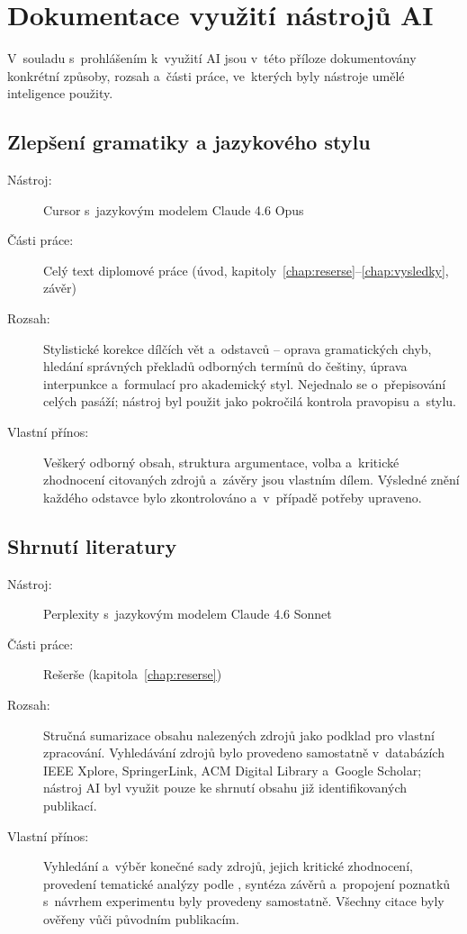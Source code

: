 \chapter{Dokumentace využití nástrojů AI}
\label{app:ai-usage}

V~souladu s~prohlášením k~využití AI jsou v~této příloze dokumentovány konkrétní způsoby, rozsah a~části práce, ve~kterých byly nástroje umělé inteligence použity.

\section*{Zlepšení gramatiky a jazykového stylu}

\begin{description}
\item[Nástroj:] Cursor \parencite{Cursor2026} s~jazykovým modelem Claude 4.6 Opus \parencite{Anthropic2025}
\item[Části práce:] Celý text diplomové práce (úvod, kapitoly~\ref{chap:reserse}--\ref{chap:vysledky}, závěr)
\item[Rozsah:] Stylistické korekce dílčích vět a~odstavců -- oprava gramatických chyb, hledání správných překladů odborných termínů do češtiny, úprava interpunkce a~formulací pro akademický styl. Nejednalo se o~přepisování celých pasáží; nástroj byl použit jako pokročilá kontrola pravopisu a~stylu.
\item[Vlastní přínos:] Veškerý odborný obsah, struktura argumentace, volba a~kritické zhodnocení citovaných zdrojů a~závěry jsou vlastním dílem. Výsledné znění každého odstavce bylo zkontrolováno a~v~případě potřeby upraveno.
\end{description}

\section*{Shrnutí literatury}

\begin{description}
\item[Nástroj:] Perplexity \parencite{Perplexity2026} s~jazykovým modelem Claude 4.6 Sonnet \parencite{Anthropic2025}
\item[Části práce:] Rešerše (kapitola~\ref{chap:reserse})
\item[Rozsah:] Stručná sumarizace obsahu nalezených zdrojů jako podklad pro vlastní zpracování. Vyhledávání zdrojů bylo provedeno samostatně v~databázích IEEE Xplore, SpringerLink, ACM Digital Library a~Google Scholar; nástroj AI byl využit pouze ke shrnutí obsahu již identifikovaných publikací.
\item[Vlastní přínos:] Vyhledání a~výběr konečné sady zdrojů, jejich kritické zhodnocení, provedení tematické analýzy podle \textcite{Braun2006}, syntéza závěrů a~propojení poznatků s~návrhem experimentu byly provedeny samostatně. Všechny citace byly ověřeny vůči původním publikacím.
\end{description}


